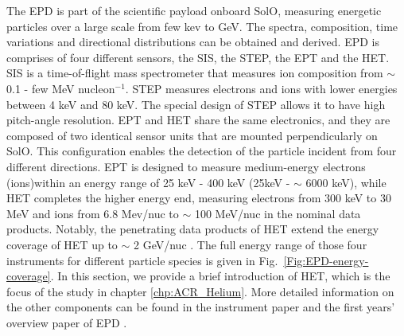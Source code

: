 The \ac{EPD} \citep{RodriguezPacheco-2019-EPD} is part of the scientific payload onboard \ac{SolO}, measuring energetic particles over a large scale from few kev to GeV. The spectra, composition, time variations and directional distributions can be obtained and derived.
\ac{EPD} is comprises of four different sensors, the \ac{SIS}, the \ac{STEP}, the \ac{EPT} and the \acl{HET}. 
\ac{SIS} is a time-of-flight mass spectrometer that measures ion composition from $\sim$ 0.1 - few MeV nucleon$^{-1}$. \ac{STEP} measures electrons and ions with lower energies between 4 keV and 80 keV. The special design of \ac{STEP} allows it to have high pitch-angle resolution.
\ac{EPT} and \ac{HET} share the same electronics, and they are composed of two identical sensor units that are mounted perpendicularly on \ac{SolO}. This configuration enables the detection of the particle incident from four different directions. \ac{EPT} is designed to measure medium-energy electrons (ions)within an energy range of 25 keV - 400 keV (25keV - $\sim$ 6000 keV), while \ac{HET} completes the higher energy end, measuring electrons from 300 keV to 30 MeV and ions from 6.8 Mev/nuc to $\sim$ 100 MeV/nuc in the nominal data products. Notably, the penetrating data products of \ac{HET} extend the energy coverage of \ac{HET} up to $\sim$ 2 GeV/nuc \citep{Elftmann-2020-PhD}.
The full energy range of those four instruments for different particle species is given in Fig.~\ref{Fig:EPD-energy-coverage}.
In this section, we provide a brief introduction of \ac{HET}, which is the focus of the study in chapter \ref{chp:ACR_Helium}. More detailed information on the other components can be found in the instrument paper \citep{RodriguezPacheco-2019-EPD} and the first years' overview paper of \ac{EPD} \citep{Wimmer2021AA}.


